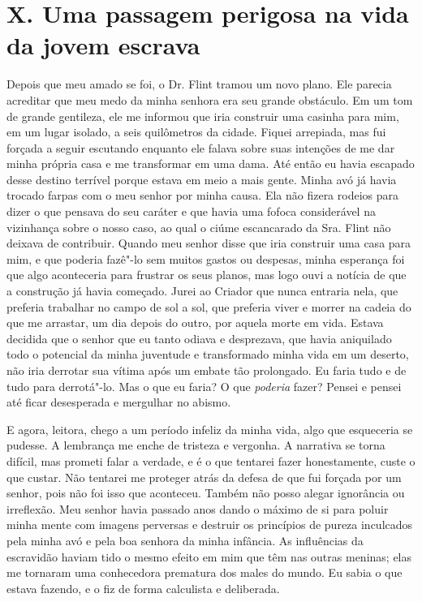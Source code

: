 \chapter{X. Uma passagem perigosa na vida da jovem
escrava}

Depois que meu amado se foi, o Dr.
Flint tramou um novo plano. Ele parecia acreditar que meu medo da minha
senhora era seu grande obstáculo. Em um tom de grande gentileza, ele me
informou que iria construir uma casinha para mim, em um lugar isolado, a
seis quilômetros da cidade. Fiquei arrepiada, mas fui forçada a seguir
escutando enquanto ele falava sobre suas intenções de me dar minha
própria casa e me transformar em uma dama. Até então eu havia escapado
desse destino terrível porque estava em meio a mais gente. Minha avó já
havia trocado farpas com o meu senhor por minha causa. Ela não fizera
rodeios para dizer o que pensava do seu caráter e que havia uma fofoca
considerável na vizinhança sobre o nosso caso, ao qual o ciúme
escancarado da Sra. Flint não deixava de contribuir. Quando meu senhor
disse que iria construir uma casa para mim, e que poderia fazê"-lo sem
muitos gastos ou despesas, minha esperança foi que algo aconteceria para
frustrar os seus planos, mas logo ouvi a notícia de que a construção já
havia começado. Jurei ao Criador que nunca entraria nela, que preferia
trabalhar no campo de sol a sol, que preferia viver e morrer na cadeia
do que me arrastar, um dia depois do outro, por aquela morte em vida.
Estava decidida que o senhor que eu tanto odiava e desprezava, que havia
aniquilado todo o potencial da minha juventude e transformado minha vida
em um deserto, não iria derrotar sua vítima após um embate tão
prolongado. Eu faria tudo e de tudo para derrotá"-lo. Mas o que eu faria?
O que \emph{poderia} fazer? Pensei e pensei até ficar desesperada e
mergulhar no abismo.

E agora, leitora, chego a um período
infeliz da minha vida, algo que esqueceria se pudesse. A lembrança me
enche de tristeza e vergonha. A narrativa se torna difícil, mas prometi
falar a verdade, e é o que tentarei fazer honestamente, custe o que
custar. Não tentarei me proteger atrás da defesa de que fui forçada por
um senhor, pois não foi isso que aconteceu.
Também não posso alegar ignorância
ou irreflexão. Meu senhor havia passado anos dando o máximo de si para
poluir minha mente com imagens perversas e destruir os princípios de
pureza inculcados pela minha avó e pela boa senhora da minha infância.
As influências da escravidão haviam tido o mesmo efeito em mim que têm
nas outras meninas; elas me tornaram uma conhecedora prematura dos males
do mundo. Eu sabia o que estava fazendo, e o fiz de forma calculista e
deliberada.

